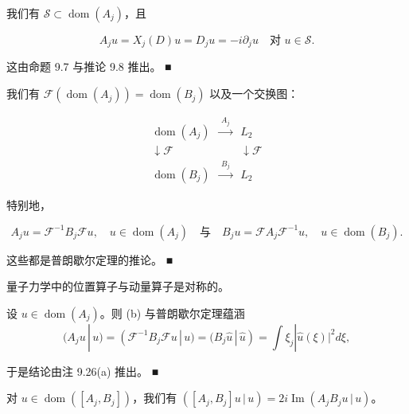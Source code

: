 \begin{remark}

\begin{items}
\item

我们有 $ \mathcal{S} \subset \operatorname{dom}(A_j) $，且

\[
A_j u = X_j(D)u = D_j u = -i\partial_j u \quad \text{对 } u \in \mathcal{S} .
\]

\proofhead
这由命题 9.7 与推论 9.8 推出。 \nobreak\hspace{0.35em}■
\item

我们有 $ \mathcal{F}(\operatorname{dom}(A_j)) = \operatorname{dom}(B_j) $ 以及一个交换图：

\begin{equation*}
\begin{array}{ccc} \operatorname{dom}(A_j) & \xrightarrow{\ A_j\ } & L_2 \\ \downarrow \mathcal{F} & & \downarrow \mathcal{F} \\ \operatorname{dom}(B_j) & \xrightarrow{\ B_j\ } & L_2 \end{array}
\end{equation*}

特别地，

\[
A_j u = \mathcal{F}^{-1}B_j\mathcal{F}u , \quad u \in \operatorname{dom}(A_j) \quad \text{与} \quad B_j u = \mathcal{F}A_j\mathcal{F}^{-1}u , \quad u \in \operatorname{dom}(B_j) .
\]

\proofhead
这些都是普朗歇尔定理的推论。 \nobreak\hspace{0.35em}■
\item

量子力学中的位置算子与动量算子是对称的。

\proofhead
设 $ u \in \operatorname{dom}(A_j) $。则 (b) 与普朗歇尔定理蕴涵
\[
(A_j u\,|\,u) = (\mathcal{F}^{-1}B_j\mathcal{F}u\,|\,u) = (B_j\hat{u}\,|\,\hat{u}) = \int \xi_j |\hat{u}(\xi)|^2 d\xi ,
\]

于是结论由注 9.26(a) 推出。 \nobreak\hspace{0.35em}■

\item

对 $ u \in \operatorname{dom}([A_j,B_j]) $，我们有 $ ([A_j,B_j]u\,|\,u) = 2i\operatorname{Im}(A_jB_j u\,|\,u) $。


\end{items}
\end{remark}
